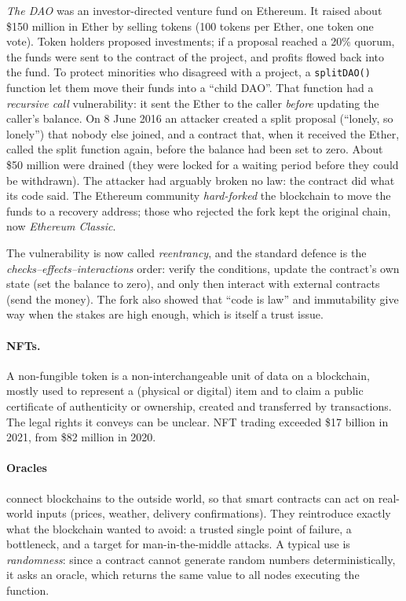 \begin{example}
\emph{The DAO} was an investor-directed venture fund on Ethereum. It raised about \$150 million in Ether by selling tokens (100 tokens per Ether, one token one vote). Token holders proposed investments; if a proposal reached a 20\% quorum, the funds were sent to the contract of the project, and profits flowed back into the fund. To protect minorities who disagreed with a project, a \texttt{splitDAO()} function let them move their funds into a \enquote{child DAO}. That function had a \emph{recursive call} vulnerability: it sent the Ether to the caller \emph{before} updating the caller's balance. On 8 June 2016 an attacker created a split proposal (\enquote{lonely, so lonely}) that nobody else joined, and a contract that, when it received the Ether, called the split function again, before the balance had been set to zero. About \$50 million were drained (they were locked for a waiting period before they could be withdrawn). The attacker had arguably broken no law: the contract did what its code said. The Ethereum community \emph{hard-forked} the blockchain to move the funds to a recovery address; those who rejected the fork kept the original chain, now \emph{Ethereum Classic}.
\end{example}

\begin{remark}
The vulnerability is now called \emph{reentrancy}, and the standard defence is the \emph{checks--effects--interactions} order: verify the conditions, update the contract's own state (set the balance to zero), and only then interact with external contracts (send the money). The fork also showed that \enquote{code is law} and immutability give way when the stakes are high enough, which is itself a trust issue.
\end{remark}

\paragraph{NFTs.} A non-fungible token is a non-interchangeable unit of data on a blockchain, mostly used to represent a (physical or digital) item and to claim a public certificate of authenticity or ownership, created and transferred by transactions. The legal rights it conveys can be unclear. NFT trading exceeded \$17 billion in 2021, from \$82 million in 2020.

\paragraph{Oracles} connect blockchains to the outside world, so that smart contracts can act on real-world inputs (prices, weather, delivery confirmations). They reintroduce exactly what the blockchain wanted to avoid: a trusted single point of failure, a bottleneck, and a target for man-in-the-middle attacks. A typical use is \emph{randomness}: since a contract cannot generate random numbers deterministically, it asks an oracle, which returns the same value to all nodes executing the function.

